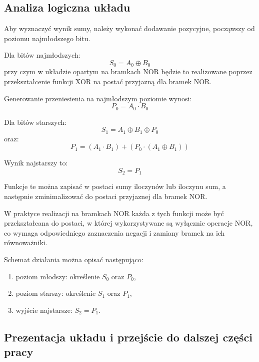 \documentclass[11pt]{article}
\begin{document}
\subsection{Analiza logiczna układu}

Aby wyznaczyć wynik sumy, należy wykonać dodawanie pozycyjne, począwszy od poziomu najmłodszego bitu.

Dla bitów najmłodszych:
\begin{equation}
S_0 = A_0 \oplus B_0
\end{equation}
przy czym w układzie opartym na bramkach NOR będzie to realizowane poprzez przekształcenie funkcji XOR na postać przyjazną dla bramek NOR.

Generowanie przeniesienia na najmłodszym poziomie wynosi:
\begin{equation}
P_0 = A_0 \cdot B_0
\end{equation}

Dla bitów starszych:
\begin{equation}
S_1 = A_1 \oplus B_1 \oplus P_0
\end{equation}
oraz:
\begin{equation}
P_1 = (A_1 \cdot B_1) + (P_0 \cdot (A_1 \oplus B_1))
\end{equation}

Wynik najstarszy to:
\begin{equation}
S_2 = P_1
\end{equation}

Funkcje te można zapisać w postaci sumy iloczynów lub iloczynu sum, a następnie zminimalizować do postaci przyjaznej dla bramek NOR.

W praktyce realizacji na bramkach NOR każda z tych funkcji może być przekształcana do postaci, w której wykorzystywane są wyłącznie operacje NOR, co wymaga odpowiedniego zaznaczenia negacji i zamiany bramek na ich równoważniki.

Schemat działania można opisać następująco:
\begin{enumerate}
    \item poziom młodszy: określenie \(S_0\) oraz \(P_0\),
    \item poziom starszy: określenie \(S_1\) oraz \(P_1\),
    \item wyjście najstarsze: \(S_2 = P_1\).
\end{enumerate}

\subsection{Prezentacja układu i przejście do dalszej części pracy}
\end{document}
